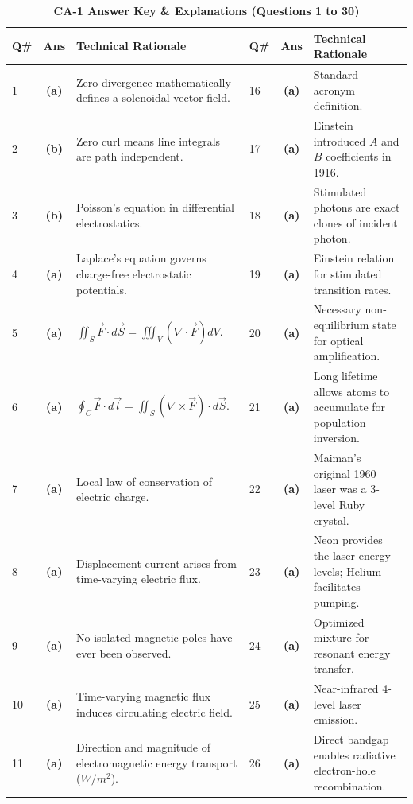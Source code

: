 \begin{table}[htbp]
\centering
\caption{\textbf{CA-1 Answer Key \& Explanations (Questions 1 to 30)}}
\vspace{2mm}
\begin{tabularx}{\textwidth}{l c X l c X}
\toprule
\textbf{Q\#} & \textbf{Ans} & \textbf{Technical Rationale} & \textbf{Q\#} & \textbf{Ans} & \textbf{Technical Rationale} \\
\midrule
1 & \textbf{(a)} & Zero divergence mathematically defines a solenoidal vector field. & 16 & \textbf{(a)} & Standard acronym definition. \\
2 & \textbf{(b)} & Zero curl means line integrals are path independent. & 17 & \textbf{(a)} & Einstein introduced $A$ and $B$ coefficients in 1916. \\
3 & \textbf{(b)} & Poisson's equation in differential electrostatics. & 18 & \textbf{(a)} & Stimulated photons are exact clones of incident photon. \\
4 & \textbf{(a)} & Laplace's equation governs charge-free electrostatic potentials. & 19 & \textbf{(a)} & Einstein relation for stimulated transition rates. \\
5 & \textbf{(a)} & $\iint_S \vec{F}\cdot d\vec{S} = \iiint_V (\nabla\cdot\vec{F}) dV$. & 20 & \textbf{(a)} & Necessary non-equilibrium state for optical amplification. \\
6 & \textbf{(a)} & $\oint_C \vec{F}\cdot d\vec{l} = \iint_S (\nabla\times\vec{F})\cdot d\vec{S}$. & 21 & \textbf{(a)} & Long lifetime allows atoms to accumulate for population inversion. \\
7 & \textbf{(a)} & Local law of conservation of electric charge. & 22 & \textbf{(a)} & Maiman's original 1960 laser was a 3-level Ruby crystal. \\
8 & \textbf{(a)} & Displacement current arises from time-varying electric flux. & 23 & \textbf{(a)} & Neon provides the laser energy levels; Helium facilitates pumping. \\
9 & \textbf{(a)} & No isolated magnetic poles have ever been observed. & 24 & \textbf{(a)} & Optimized mixture for resonant energy transfer. \\
10 & \textbf{(a)} & Time-varying magnetic flux induces circulating electric field. & 25 & \textbf{(a)} & Near-infrared 4-level laser emission. \\
11 & \textbf{(a)} & Direction and magnitude of electromagnetic energy transport ($W/m^2$). & 26 & \textbf{(a)} & Direct bandgap enables radiative electron-hole recombination. \\

\end{tabularx}
\end{table}
